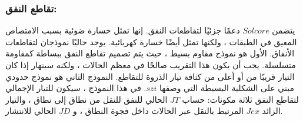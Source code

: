 \subsubsection{تقاطع النفق:}
يتضمن $ Solcore $ دعمًا جزئيًا لتقاطعات النفق. إنها تمثل خسارة ضوئية بسبب الامتصاص المعيق في الطبقات ، ولكنها تمثل أيضًا خسارة كهربائية. يوجد حاليًا نموذجان لتقاطعات الأنفاق. الأول هو نموذج مقاوم بسيط ، حيث يتم تصميم تقاطع النفق ببساطة كمقاومة متسلسلة. يجب أن يكون هذا التقريب صالحًا في معظم الحالات ، ولكنه سينهار إذا كان التيار قريبًا من أو أعلى من كثافة تيار الذروة للتقاطع.
النموذج الثاني هو نموذج حدودي مبني على الشكلية البسيطة التي وصفها $ szi $. في هذا النموذج ، سيكون للتيار الإجمالي لتقاطع النفق ثلاثة مكونات: حساب $ JT $ الحالي للنفق للنقل من نطاق إلى نطاق ، والتيار الزائد $ Jex $ المرتبط بالنقل عبر الحالات داخل فجوة النطاق ، و $ JD $ الحالي للانتشار.

























